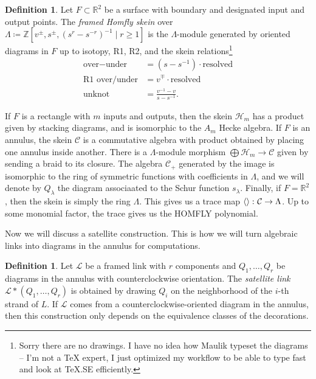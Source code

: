 \documentclass{amsart}
\theoremstyle{definition}
\newtheorem{defn}[thm]{Definition}
\theoremstyle{remark}
\theoremstyle{plain}
\theoremstyle{definition}
\theoremstyle{remark}
\newcommand{\R}{\mathbb{R}}
\newcommand{\Z}{\mathbb{Z}}
\newcommand{\mc}[1]{\mathcal{#1}}
\newcommand{\1}{\mathbf{1}}
\newcommand{\2}{\mathbf{2}}
\newcommand{\3}{\mathbf{3}}
\begin{document}
\begin{defn}
    Let $F \subset \R^2$ be a surface with boundary and designated input and output points. The \textit{framed Homfly skein} over $\Lambda \coloneqq \Z[v^{\pm}, s^{\pm}, {(s^r - s^{-r})}^{-1} \mid r \geq 1]$ is the $\Lambda$-module generated by oriented diagrams in $F$ up to isotopy, R1, R2, and the skein relations\footnote{Sorry there are no drawings. I have no idea how Maulik typeset the diagrams -- I'm not a TeX expert, I just optimized my workflow to be able to type fast and look at TeX.SE efficiently.}
    \begin{align}
        \text{over} - \text{under} &= (s-s^{-1}) \cdot \text{resolved} \\
        \text{R1 over/under} &= v^{\mp} \cdot \text{resolved} \\
        \text{unknot} &= \frac{v^{-1} - v}{s-s^{-1}}.
    \end{align}
\end{defn}

If $F$ is a rectangle with $m$ inputs and outputs, then the skein $\mc{H}_m$ has a product given by stacking diagrams, and is isomorphic to the $A_m$ Hecke algebra. If $F$ is an annulus, the skein $\mc{C}$ is a commutative algebra with product obtained by placing one annulus inside another. There is a $\Lambda$-module morphism $\bigoplus \mc{H}_m \to \mc{C}$ given by sending a braid to its closure. The algebra $\mc{C}_+$ generated by the image is isomorphic to the ring of symmetric functions with coefficients in $\Lambda$, and we will denote by $Q_{\lambda}$ the diagram associaated to the Schur function $s_{\lambda}$. Finally, if $F = \R^2$, then the skein is simply the ring $\Lambda$. This gives us a trace map $\ev{} \colon \mc{C} \to \Lambda$. Up to some monomial factor, the trace gives us the HOMFLY polynomial.

Now we will discuss a satellite construction. This is how we will turn algebraic links into diagrams in the annulus for computations.

\begin{defn}
    Let $\mc{L}$ be a framed link with $r$ components and $Q_1, \ldots, Q_r$ be diagrams in the annulus with counterclockwise orientation. The \textit{satellite link} $\mc{L} * (Q_1, \ldots, Q_r)$ is obtained by drawing $Q_i$ on the neighborhood of the $i$-th strand of $L$. If $\mc{L}$ comes from a counterclockwise-oriented diagram in the annulus, then this construction only depends on the equivalence classes of the decorations.
\end{defn}
\end{document}
